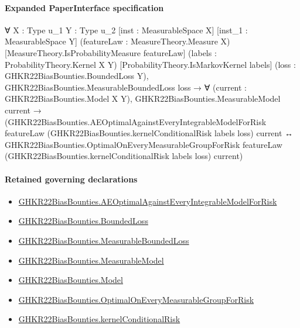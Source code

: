 \documentclass[10pt]{article}
\begin{document}
\paragraph{Expanded PaperInterface specification}
\begin{ReviewVerbatim}
∀ {X : Type u_1} {Y : Type u_2} [inst : MeasurableSpace X] [inst_1 : MeasurableSpace Y]
  (featureLaw : MeasureTheory.Measure X) [MeasureTheory.IsProbabilityMeasure featureLaw]
  (labels : ProbabilityTheory.Kernel X Y) [ProbabilityTheory.IsMarkovKernel labels]
  (loss : GHKR22BiasBounties.BoundedLoss Y),
  GHKR22BiasBounties.MeasurableBoundedLoss loss →
    ∀ (current : GHKR22BiasBounties.Model X Y),
      GHKR22BiasBounties.MeasurableModel current →
        (GHKR22BiasBounties.AEOptimalAgainstEveryIntegrableModelForRisk featureLaw
            (GHKR22BiasBounties.kernelConditionalRisk labels loss) current ↔
          GHKR22BiasBounties.OptimalOnEveryMeasurableGroupForRisk featureLaw
            (GHKR22BiasBounties.kernelConditionalRisk labels loss) current)
\end{ReviewVerbatim}

\paragraph{Retained governing declarations}
\begin{itemize}\raggedright
\item \hyperlink{governing-declaration-cf56ba97d8120496}{GHKR22\allowbreak{}Bias\allowbreak{}Bounties.\allowbreak{}AE\allowbreak{}Optimal\allowbreak{}Against\allowbreak{}Every\allowbreak{}Integrable\allowbreak{}Model\allowbreak{}For\allowbreak{}Risk}
\item \hyperlink{paper-prerequisite-ef6c319b0770dad4}{GHKR22\allowbreak{}Bias\allowbreak{}Bounties.\allowbreak{}Bounded\allowbreak{}Loss}
\item \hyperlink{governing-declaration-56b96e1cde76e3f7}{GHKR22\allowbreak{}Bias\allowbreak{}Bounties.\allowbreak{}Measurable\allowbreak{}Bounded\allowbreak{}Loss}
\item \hyperlink{governing-declaration-8b721c00962c326a}{GHKR22\allowbreak{}Bias\allowbreak{}Bounties.\allowbreak{}Measurable\allowbreak{}Model}
\item \hyperlink{paper-prerequisite-333127605c12eba8}{GHKR22\allowbreak{}Bias\allowbreak{}Bounties.\allowbreak{}Model}
\item \hyperlink{governing-declaration-238e896ecc99f8eb}{GHKR22\allowbreak{}Bias\allowbreak{}Bounties.\allowbreak{}Optimal\allowbreak{}On\allowbreak{}Every\allowbreak{}Measurable\allowbreak{}Group\allowbreak{}For\allowbreak{}Risk}
\item \hyperlink{paper-prerequisite-868c7eaf7196c687}{GHKR22\allowbreak{}Bias\allowbreak{}Bounties.\allowbreak{}kernel\allowbreak{}Conditional\allowbreak{}Risk}
\end{itemize}
\end{document}
